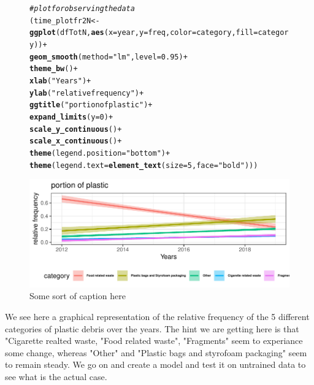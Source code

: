 \documentclass[10pt]{article}\usepackage[]{graphicx}\usepackage[]{color}
\makeatletter
\newcommand{\hlnum}[1]{\textcolor[rgb]{0.686,0.059,0.569}{#1}}%
\newcommand{\hlstr}[1]{\textcolor[rgb]{0.192,0.494,0.8}{#1}}%
\newcommand{\hlcom}[1]{\textcolor[rgb]{0.678,0.584,0.686}{\textit{#1}}}%
\newcommand{\hlopt}[1]{\textcolor[rgb]{0,0,0}{#1}}%
\newcommand{\hlstd}[1]{\textcolor[rgb]{0.345,0.345,0.345}{#1}}%
\newcommand{\hlkwb}[1]{\textcolor[rgb]{0.69,0.353,0.396}{#1}}%
\newcommand{\hlkwc}[1]{\textcolor[rgb]{0.333,0.667,0.333}{#1}}%
\newcommand{\hlkwd}[1]{\textcolor[rgb]{0.737,0.353,0.396}{\textbf{#1}}}%
\newenvironment{kframe}{%
 \def\at@end@of@kframe{}%
 \ifinner\ifhmode%
  \def\at@end@of@kframe{\end{minipage}}%
  \begin{minipage}{\columnwidth}%
 \fi\fi%
 \def\FrameCommand##1{\hskip\@totalleftmargin \hskip-\fboxsep
 \colorbox{shadecolor}{##1}\hskip-\fboxsep
     \hskip-\linewidth \hskip-\@totalleftmargin \hskip\columnwidth}%
 \MakeFramed {\advance\hsize-\width
   \@totalleftmargin\z@ \linewidth\hsize
   \@setminipage}}%
 {\par\unskip\endMakeFramed%
 \at@end@of@kframe}
\newenvironment{knitrout}{}{} %
\makeatother
\begin{document}
\begin{figure}[H] 
\begin{center}
\begin{knitrout}\small
{}\color{fgcolor}\begin{kframe}
\begin{alltt}
\hlcom{# plot for observing the data}
\hlstd{(time_plotfr2N} \hlkwb{<-} \hlkwd{ggplot}\hlstd{(dfTotN,} \hlkwd{aes}\hlstd{(}\hlkwc{x} \hlstd{= year,} \hlkwc{y} \hlstd{= freq,} \hlkwc{color}\hlstd{=category,} \hlkwc{fill} \hlstd{= category))} \hlopt{+}
  \hlkwd{geom_smooth}\hlstd{(}\hlkwc{method}\hlstd{=}\hlstr{"lm"}\hlstd{,} \hlkwc{level}\hlstd{=}\hlnum{0.95}\hlstd{)} \hlopt{+}
  \hlkwd{theme_bw}\hlstd{()} \hlopt{+}
  \hlkwd{xlab}\hlstd{(}\hlstr{"Years"}\hlstd{)} \hlopt{+}
  \hlkwd{ylab}\hlstd{(}\hlstr{"relative frequency"}\hlstd{)} \hlopt{+}
  \hlkwd{ggtitle}\hlstd{(}\hlstr{"portion of plastic"}\hlstd{)} \hlopt{+}
  \hlkwd{expand_limits}\hlstd{(}\hlkwc{y}\hlstd{=}\hlnum{0}\hlstd{)} \hlopt{+}
  \hlkwd{scale_y_continuous}\hlstd{()} \hlopt{+}
  \hlkwd{scale_x_continuous}\hlstd{()}\hlopt{+}
  \hlkwd{theme}\hlstd{(}\hlkwc{legend.position}\hlstd{=}\hlstr{"bottom"}\hlstd{)}\hlopt{+}
  \hlkwd{theme}\hlstd{(}\hlkwc{legend.text} \hlstd{=} \hlkwd{element_text}\hlstd{(}\hlkwc{size}\hlstd{=}\hlnum{5}\hlstd{,} \hlkwc{face}\hlstd{=}\hlstr{"bold"}\hlstd{)))}
\end{alltt}
\end{kframe}
\includegraphics[width=1\linewidth]{figure/unnamed-chunk-37-1} 

\end{knitrout}
\caption {Some sort of caption here}
\label{figG1}
\end {center}
\end {figure}


We see here a graphical representation of the relative frequency of the 5 different categories of plastic debris over the years. The hint we are getting here is that "Cigarette realted waste, "Food related waste", "Fragments" seem to experiance some change, whereas "Other" and "Plastic bags and styrofoam packaging" seem to remain steady. We go on and create a model and test it on untrained data to see what is the actual case.
\end{document}
